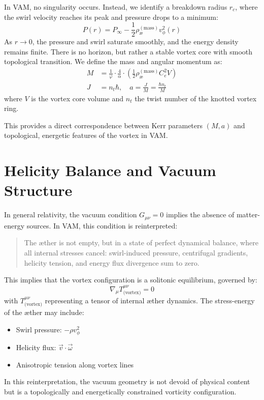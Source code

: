 \documentclass[twocolumn,aps,pre,floatfix,nofootinbib]{revtex4-2}
\begin{document}
    In VAM, no singularity occurs. Instead, we identify a breakdown radius \( r_c \), where the swirl velocity reaches its peak and pressure drops to a minimum:
    \[
        P(r) = P_\infty - \frac{1}{2} \rho_{\text{\ae}}^{(\text{mass})} v_\phi^2(r)
    \]
    As \( r \to 0 \), the pressure and swirl saturate smoothly, and the energy density remains finite. There is no horizon, but rather a stable vortex core with smooth topological transition. We define the mass and angular momentum as:
    \begin{align}
        M &= \frac{1}{\varphi} \cdot \frac{4}{\alpha} \cdot \left( \frac{1}{2} \rho_{\text{\ae}}^{(\text{mass})} C_e^2 V \right) \\
        J &= n_t \hbar, \quad a = \frac{J}{M} = \frac{\hbar n_t}{M}
    \end{align}
    where \( V \) is the vortex core volume and \( n_t \) the twist number of the knotted vortex ring.

    This provides a direct correspondence between Kerr parameters \( (M, a) \) and topological, energetic features of the vortex in VAM.




    \section{Helicity Balance and Vacuum Structure}

    In general relativity, the vacuum condition \( G_{\mu\nu} = 0 \) implies the absence of matter-energy sources. In VAM, this condition is reinterpreted:
    \begin{quote}
        The æther is not empty, but in a state of perfect dynamical balance, where all internal stresses cancel: swirl-induced pressure, centrifugal gradients, helicity tension, and energy flux divergence sum to zero.
    \end{quote}
    This implies that the vortex configuration is a solitonic equilibrium, governed by:
    \[
        \nabla_\mu T^{\mu\nu}_{\text{(vortex)}} = 0
    \]
    with \( T^{\mu\nu}_{\text{(vortex)}} \) representing a tensor of internal æther dynamics. The stress-energy of the æther may include:
    \begin{itemize}
        \item Swirl pressure: \( -\rho v_\phi^2 \)
        \item Helicity flux: \( \vec{v} \cdot \vec{\omega} \)
        \item Anisotropic tension along vortex lines
    \end{itemize}
    In this reinterpretation, the vacuum geometry is not devoid of physical content but is a topologically and energetically constrained vorticity configuration.
\end{document}
